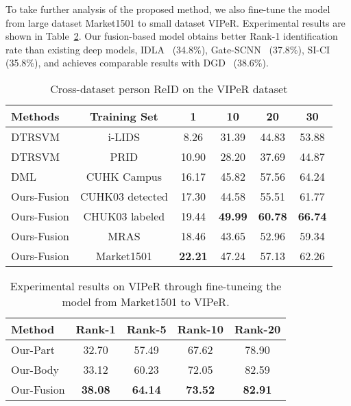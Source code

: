 \documentclass[10pt,twocolumn,letterpaper]{article}
\begin{document}
To take further analysis of the proposed method, we also fine-tune the model from large dataset Market1501 to small dataset VIPeR.
Experimental results are shown in Table~\ref{tab:markettransfertoviper}.
Our fusion-based model obtains better Rank-1 identification rate than existing deep models, \eg IDLA~\cite{AhmedCVPR15improved} (34.8\%), Gate-SCNN~\cite{VariorECCV16Gated} (37.8\%), SI-CI~\cite{WangfaqiangCVPR16JSC} (35.8\%), and achieves comparable results with DGD~\cite{XiaotongCVPR16Domain} (38.6\%).

\begin{table}[btbp]
  \begin{center}
    \scriptsize
    \begin{tabular}{|l|c|c c c c |}
    \hline
    Methods & Training Set & 1     & 10    & 20    & 30 \\
    \hline
    \hline
    DTRSVM~\cite{MaICCV13domain} & i-LIDS & 8.26  & 31.39  & 44.83  & 53.88  \\
DTRSVM~\cite{MaICCV13domain} & PRID  & 10.90  & 28.20  & 37.69  & 44.87  \\
DML~\cite{YiICPR14DML}   & CUHK Campus & 16.17  & 45.82  & 57.56  & 64.24  \\
    \hline
    \hline
    Ours-Fusion  & CUHK03 detected & 17.30  & 44.58  & 55.51  & 61.77  \\
Ours-Fusion  & CHUK03 labeled &  19.44     &   \textbf{49.99}    &   \textbf{60.78}     &  \textbf{66.74} \\
Ours-Fusion  & MRAS  & 18.46 &  43.65 &  52.96  &  59.34  \\
Ours-Fusion  & Market1501 & \textbf{22.21} &  47.24 &  57.13  & 62.26  \\
    \hline
    \end{tabular}\end{center}
  \vspace{-0.5em}
  \caption{Cross-dataset person ReID on the VIPeR dataset}
  \vspace{0em}
  \label{tab:crossviper}\end{table}

\begin{table}[tbp]
  \begin{center}
  \scriptsize
  \begin{tabular}{|l|cccc|}
  \hline
  Method & Rank-1 & Rank-5 & Rank-10 & Rank-20 \\
  \hline
  Our-Part & 32.70  & 57.49 & 67.62 & 78.90 \\
  Our-Body & 33.12 & 60.23 & 72.05 & 82.59 \\
  Our-Fusion & \textbf{38.08} & \textbf{64.14} & \textbf{73.52} & \textbf{82.91} \\
  \hline
  \end{tabular}\end{center}
  \vspace{-0.5em}
  \caption{Experimental results on VIPeR through fine-tuneing the model from Market1501 to VIPeR.}
  \vspace{-1.0em}
  \label{tab:markettransfertoviper}\end{table}
\end{document}
